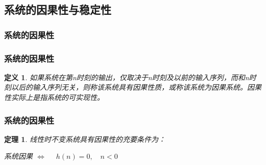\documentclass[notheorems,compress,mathserif,table]{beamer}
\newtheorem{theorem}{定理}
\newtheorem{definition}{定义}
\newtheorem{shuoming}{说明}
\begin{document}
\subsection{系统的因果性与稳定性}



\subsubsection*{系统的因果性}
\begin{frame}[shrink]\frametitle{系统的因果性}%

\begin{definition}
    如果系统在第n时刻的输出，仅取决于n时刻及以前的输入序列，而和n时刻以后的输入序列无关，则称该系统具有因果性质，或称该系统为因果系统。因果性实际上是指系统的可实现性。
\end{definition}
\end{frame}

\begin{frame}[shrink]\frametitle{系统的因果性}%
\begin{theorem}{线性时不变系统具有因果性的充要条件为：}
\begin{center}
系统因果 $\Longleftrightarrow$ $\quad h(n) =0,\quad n<0 $
\end{center}
\end{theorem}


\end{frame}

%
\end{document}
